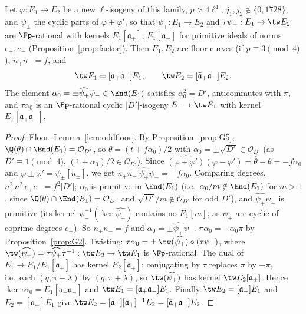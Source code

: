 \begin{lemma}\label{lem:oddalpha}
Let $\varphi:E_1\to E_2$ be a new $\ell$-isogeny of this family, $p>4\ell^4$, $j_1,j_2\notin\{0,1728\}$, and $\psi_\pm$ the
cyclic parts of $\varphi\pm\varphi'$, so that $\psi_+:E_1\to E_2$ and $\tau\psi_-:E_1\to\tw E_2$ are $\Fp$-rational with
kernels $E_1[\mathfrak a_+]$, $E_1[\mathfrak a_-]$ for primitive ideals of norms $e_+,e_-$ (Proposition~\ref{prop:factor}).
Then $E_1,E_2$ are floor curves (if $p\equiv3\pmod 4$), $n_+n_-=f$, and
\[\tw E_1=[\mathfrak a_+\mathfrak a_-]E_1,\qquad \tw E_2=[\bar{\mathfrak a}_+\mathfrak a_-]E_2 .\]
The element $\alpha_0=\pm\widehat{\psi_+}\psi_-\in\End(E_1)$ satisfies $\alpha_0^2=D'$, anticommutes with $\pi$, and
$\tau\alpha_0$ is an $\Fp$-rational cyclic $|D'|$-isogeny $E_1\to\tw E_1$ with kernel $E_1[\mathfrak a_+\mathfrak a_-]$.
\end{lemma}
\begin{proof}
Floor: Lemma~\ref{lem:oddfloor}.  By Proposition~\ref{prop:G5}, $\Q(\theta)\cap\End(E_1)=\mathcal O_{D'}$, so
$\theta=(t+f\alpha_0)/2$ with $\alpha_0=\pm\sqrt{D'}\in\mathcal O_{D'}$ (as $D'\equiv1\pmod4$, $(1+\alpha_0)/2\in\mathcal O_{D'}$).
Since $\widehat{(\varphi+\varphi')}(\varphi-\varphi')=\widehat\theta-\theta=-f\alpha_0$ and
$\varphi\pm\varphi'=\psi_\pm[n_\pm]$, we get $n_+n_-\,\widehat{\psi_+}\psi_-=-f\alpha_0$.  Comparing degrees,
$n_+^2n_-^2e_+e_-=f^2|D'|$; $\alpha_0$ is primitive in $\End(E_1)$ (i.e.\ $\alpha_0/m\notin\End(E_1)$ for $m>1$, since
$\Q(\theta)\cap\End(E_1)=\mathcal O_{D'}$ and $\sqrt{D'}/m\notin\mathcal O_{D'}$ for odd $D'$), and $\widehat{\psi_+}\psi_-$ is
primitive (its kernel $\psi_-^{-1}(\ker\widehat{\psi_+})$ contains no $E_1[m]$, as $\psi_\pm$ are cyclic of coprime degrees
$e_\pm$).  So $n_+n_-=f$ and $\alpha_0=\pm\widehat{\psi_+}\psi_-$.  $\pi\alpha_0=-\alpha_0\pi$ by Proposition~\ref{prop:G2}.
Twisting: $\tau\alpha_0=\pm\,\tw(\widehat{\psi_+})\circ(\tau\psi_-)$, where $\tw(\widehat{\psi_+})=\tau\widehat{\psi_+}\tau^{-1}:\tw E_2\to\tw E_1$
is $\Fp$-rational.  The dual of $E_1\to E_1/E_1[\mathfrak a_+]$ has kernel $E_2[\bar{\mathfrak a}_+]$; conjugating by $\tau$ replaces
$\pi$ by $-\pi$, i.e.\ each $(q,\pi-\lambda)$ by $(q,\pi+\lambda)$, so $\tw(\widehat{\psi_+})$ has kernel $\tw E_2[\mathfrak a_+]$.
Hence $\ker\tau\alpha_0=E_1[\mathfrak a_+\mathfrak a_-]$ and $\tw E_1=[\mathfrak a_+\mathfrak a_-]E_1$.  Finally
$\tw E_2=[\mathfrak a_-]E_1$ and $E_2=[\mathfrak a_+]E_1$ give $\tw E_2=[\mathfrak a_-][\mathfrak a_+]^{-1}E_2=[\bar{\mathfrak a}_+\mathfrak a_-]E_2$.
\end{proof}

